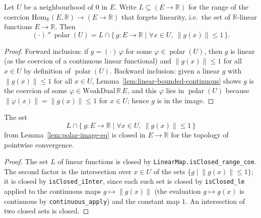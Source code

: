 \begin{lemma}
    \label{lem:polar-image-eq}
    Let $U$ be a neighbourhood of $0$ in $E$. Write
    $L \subseteq (E \to \mathbb{R})$ for the range of the coercion
    $\mathrm{Hom}_{\mathbb{R}}(E, \mathbb{R}) \to (E \to \mathbb{R})$ that forgets
    linearity, i.e.\ the set of $\mathbb{R}$-linear functions $E \to \mathbb{R}$.
    Then
    \[
        (\cdot)\,''\,\operatorname{polar}(U)
        = L \cap \{\, g : E \to \mathbb{R} \mid
              \forall x \in U,\ \lVert g(x) \rVert \le 1 \,\}.
    \]
\end{lemma}
\begin{proof}
    Forward inclusion: if $g = (\cdot)\,\varphi$ for some
    $\varphi \in \operatorname{polar}(U)$, then $g$ is linear (as the coercion of
    a continuous linear functional) and $\lVert g(x) \rVert \le 1$ for all
    $x \in U$ by definition of $\operatorname{polar}(U)$. Backward inclusion:
    given a linear $g$ with $\lVert g(x) \rVert \le 1$ for all $x \in U$,
    Lemma~\ref{lem:linear-bounded-continuous} shows $g$ is the coercion of some
    $\varphi \in \mathrm{WeakDual}\,\mathbb{R}\,E$, and this $\varphi$ lies in
    $\operatorname{polar}(U)$ because $\lVert \varphi(x) \rVert = \lVert g(x)
    \rVert \le 1$ for $x \in U$; hence $g$ is in the image.
\end{proof}

\begin{lemma}
    \label{lem:polar-image-closed}
    The set
    \[
        L \cap \{\, g : E \to \mathbb{R} \mid
              \forall x \in U,\ \lVert g(x) \rVert \le 1 \,\}
    \]
    from Lemma~\ref{lem:polar-image-eq} is closed in $E \to \mathbb{R}$ for the
    topology of pointwise convergence.
\end{lemma}
\begin{proof}
    The set $L$ of linear functions is closed by
    \texttt{LinearMap.isClosed\_range\_coe}. The second factor is the
    intersection over $x \in U$ of the sets
    $\{ g \mid \lVert g(x) \rVert \le 1 \}$; it is closed by
    \texttt{isClosed\_iInter}, since each such set is closed by
    \texttt{isClosed\_le} applied to the continuous maps $g \mapsto \lVert g(x)
    \rVert$ (the evaluation $g \mapsto g(x)$ is continuous by
    \texttt{continuous\_apply}) and the constant map $1$. An intersection of two
    closed sets is closed.
\end{proof}

